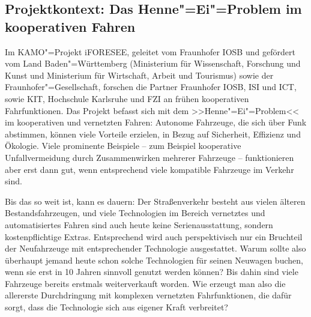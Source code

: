 

\subsection{Projektkontext: Das Henne"=Ei"=Problem im kooperativen Fahren}



Im KAMO"=Projekt iFORESEE, geleitet vom Fraunhofer IOSB und gefördert vom Land %
Baden"=Württemberg
 (Ministerium für Wissenschaft, Forschung und Kunst und Ministerium für Wirtschaft, Arbeit und Tourismus) sowie der Fraunhofer"=Gesellschaft, forschen die Partner Fraunhofer IOSB, ISI und ICT, sowie KIT, Hochschule Karlsruhe und FZI an frühen kooperativen Fahrfunktionen. Das Projekt befasst sich mit dem >>Henne"=Ei"=Problem<< im kooperativen und vernetzten Fahren: Autonome Fahrzeuge, die sich über Funk abstimmen, können viele Vorteile erzielen, in Bezug auf Sicherheit, Effizienz und Ökologie. Viele prominente Beispiele -- zum Beispiel kooperative Unfallvermeidung durch Zusammenwirken mehrerer Fahrzeuge -- funktionieren aber erst dann gut, wenn entsprechend viele kompatible Fahrzeuge im Verkehr sind.



Bis das so weit ist, kann es dauern: Der Straßenverkehr besteht aus vielen älteren Bestandsfahrzeugen, und viele Technologien im Bereich vernetztes und automatisiertes Fahren sind auch heute keine Serienausstattung, sondern kostenpflichtige Extras. Entsprechend wird auch perspektivisch nur ein Bruchteil der Neufahrzeuge mit entsprechender Technologie ausgestattet. Warum sollte also überhaupt jemand heute schon solche Technologien für seinen Neuwagen buchen, wenn sie erst in 10 Jahren sinnvoll genutzt werden können? Bis dahin sind viele Fahrzeuge bereits erstmals weiterverkauft worden. Wie erzeugt man also die allererste Durchdringung mit komplexen vernetzten Fahrfunktionen, die dafür sorgt, dass die Technologie sich aus eigener Kraft verbreitet?


